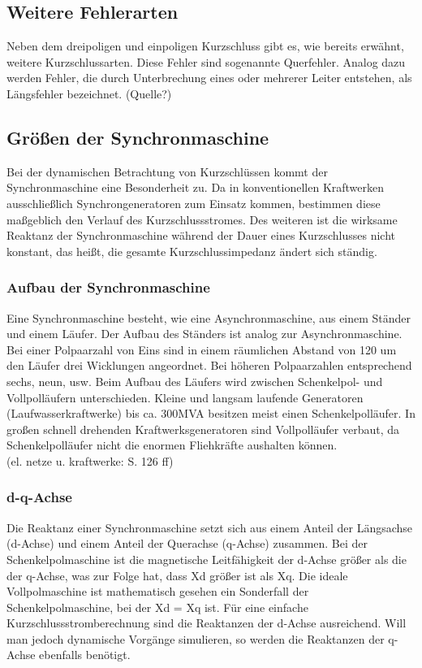 \documentclass{scrartcl}
\begin{document}
\begin{onehalfspace}
\subsection{Weitere Fehlerarten}
Neben dem dreipoligen und einpoligen Kurzschluss gibt es, wie bereits erwähnt, weitere Kurzschlussarten. Diese Fehler sind sogenannte \glqq Querfehler\grqq{}. Analog dazu werden Fehler, die durch Unterbrechung eines oder mehrerer Leiter entstehen, als \glqq Längsfehler\grqq{} bezeichnet. (Quelle?)

\subsection{Größen der Synchronmaschine}
Bei der dynamischen Betrachtung von Kurzschlüssen kommt der Synchronmaschine eine Besonderheit zu. Da in konventionellen Kraftwerken ausschließlich Synchrongeneratoren zum Einsatz kommen, bestimmen diese maßgeblich den Verlauf des Kurzschlussstromes. Des weiteren ist die wirksame Reaktanz der Synchronmaschine während der Dauer eines Kurzschlusses nicht konstant, das heißt, die gesamte Kurzschlussimpedanz ändert sich ständig.

\subsubsection{Aufbau der Synchronmaschine}
Eine Synchronmaschine besteht, wie eine Asynchronmaschine, aus einem Ständer und einem Läufer. Der Aufbau des Ständers ist analog zur Asynchronmaschine. Bei einer Polpaarzahl von Eins sind in einem räumlichen Abstand von 120\degree{} um den Läufer drei Wicklungen angeordnet. Bei höheren Polpaarzahlen entsprechend sechs, neun, usw. Beim Aufbau des Läufers wird zwischen Schenkelpol- und Vollpolläufern unterschieden. Kleine und langsam laufende Generatoren (Laufwasserkraftwerke) bis ca. 300MVA besitzen meist einen Schenkelpolläufer. In großen schnell drehenden Kraftwerksgeneratoren sind Vollpolläufer verbaut, da Schenkelpolläufer nicht die enormen Fliehkräfte aushalten können. 
\\ (el. netze u. kraftwerke: S. 126 ff)

\subsubsection{d-q-Achse}
Die Reaktanz einer Synchronmaschine setzt sich aus einem Anteil der Längsachse (d-Achse) und einem Anteil der Querachse (q-Achse) zusammen. Bei der Schenkelpolmaschine ist die magnetische Leitfähigkeit der d-Achse größer als die der q-Achse, was zur Folge hat, dass Xd größer ist als Xq. Die ideale Vollpolmaschine ist mathematisch gesehen ein Sonderfall der Schenkelpolmaschine, bei der Xd = Xq ist. Für eine einfache Kurzschlussstromberechnung sind die Reaktanzen der d-Achse ausreichend. Will man jedoch dynamische Vorgänge simulieren, so werden die Reaktanzen der q-Achse ebenfalls benötigt. \\


\end{onehalfspace}
\end{document}
